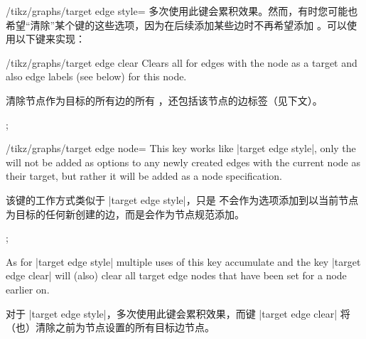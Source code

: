 \begin{key}{/tikz/graphs/target edge style=}
    多次使用此键会累积效果。然而，有时您可能也希望``清除''某个键的这些选项，因为在后续添加某些边时不再希望添加 。可以使用以下键来实现：

    \begin{key}{/tikz/graphs/target edge clear}
        Clears all  for edges with the node as a target and
        also edge labels (see below) for this node.

        清除节点作为目标的所有边的所有 ，还包括该节点的边标签（见下文）。
    \end{key}
\begin{codeexample}[preamble={\usetikzlibrary{graphs}}]
\tikz {};
\end{codeexample}
\end{key}

\begin{key}{/tikz/graphs/target edge node=}
    This key works like |target edge style|, only the 
    will not be added as options to any newly created edges with the current
    node as their target, but rather it will be added as a node specification.
    
    该键的工作方式类似于 |target edge style|，只是  不会作为选项添加到以当前节点为目标的任何新创建的边，而是会作为节点规范添加。
\begin{codeexample}[preamble={\usetikzlibrary{graphs}}]
\tikz {};
\end{codeexample}
    As for |target edge style| multiple uses of this key accumulate and the key
    |target edge clear| will (also) clear all target edge nodes that have been
    set for a node earlier on.

    对于 |target edge style|，多次使用此键会累积效果，而键 |target edge clear| 将（也）清除之前为节点设置的所有目标边节点。

\end{key}

